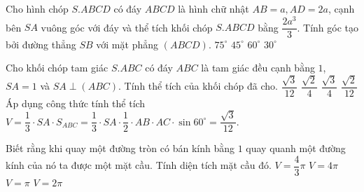 \begin{ex}%
	Cho hình chóp $S.ABCD$ có đáy $ABCD$ là hình chữ nhật $AB = a, AD = 2a$, cạnh bên $SA$ vuông góc với đáy và thể tích khối chóp $S.ABCD$ bằng $\dfrac{2a^3}{3}$. Tính góc tạo bởi đường thẳng $SB$ với mặt phẳng $(ABCD)$.
	\choice
	{$75^\circ$}
	{\True $45^\circ$}
	{$60^\circ$}
	{$30^\circ$}
\end{ex}

\begin{ex}%
	Cho khối chóp tam giác $S.ABC$ có đáy $ABC$ là tam giác đều cạnh bằng $1$, $SA = 1$ và $SA \perp (ABC)$. Tính thể tích của khối chóp đã cho.
	\choice
	{\True $\dfrac{\sqrt{3}}{12}$}
	{$\dfrac{\sqrt{2}}{4}$}
	{$\dfrac{\sqrt{3}}{4}$}
	{$\dfrac{\sqrt{2}}{12}$}
	\loigiai
	{Áp dụng công thức tính thể tích $V = \dfrac{1}{3} \cdot SA \cdot S_{ABC} = \dfrac{1}{3} \cdot SA \cdot \dfrac{1}{2} \cdot AB \cdot AC \cdot \sin 60^\circ = \dfrac{\sqrt{3}}{12}$.}
\end{ex}

\begin{ex}%
	Biết rằng khi quay một đường tròn có bán kính bằng $1$ quay quanh một đường kính của nó ta được một mặt cầu. Tính diện tích mặt cầu đó.
	\choice
	{$V = \dfrac{4}{3}\pi$}
	{\True $V = 4\pi$}
	{$V = \pi$}
	{$V = 2\pi$}
\end{ex}


